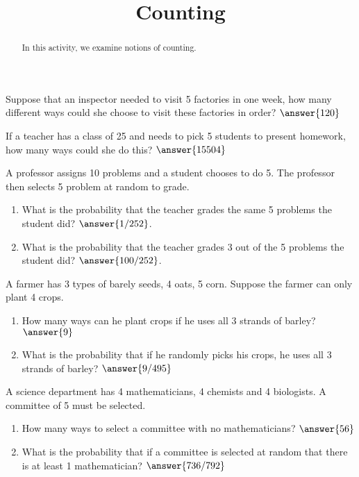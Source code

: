 \documentclass{ximera}
\title{Counting}
\begin{document}
      
\begin{abstract}
      
In this activity, we examine notions of counting.

      
\end{abstract}
      
\maketitle
 
\begin{problem}
Suppose that an inspector needed to visit 5 factories in one week, how many different ways could she choose to visit these factories in order? $\answer{120}$
\end{problem}

\begin{problem}
If a teacher has a class of 25 and needs to pick 5 students to present homework, how many ways could she do this? $\answer{15504}$
\end{problem}

\begin{problem}
A professor assigns 10 problems and a student chooses to do 5.  The professor then selects 5 problem at random to grade.

\begin{enumerate}
\item What is the probability that the teacher grades the same 5 problems the student did?  $\answer{1/252}$.
\item What is the probability that the teacher grades 3 out of the  5 problems the student did?  $\answer{100/252}$.
\end{enumerate}

\end{problem}

\begin{problem}
A farmer has 3 types of barely seeds, 4 oats, 5 corn.  Suppose the farmer can only plant 4 crops.

\begin{enumerate}
\item How many ways can he plant crops if he uses all 3 strands of barley? $\answer{9}$
\item What is the probability that if he randomly picks his crops, he uses all 3 strands of barley? $\answer{9/495}$
\end{enumerate}


\end{problem}

\begin{problem}
A  science department has 4 mathematicians, 4 chemists and 4 biologists.  A committee of 5 must be selected.

\begin{enumerate}
\item How many ways to select a committee with no mathematicians? $\answer{56}$
\item What is the probability that if a committee is selected at random that there is at least 1 mathematician? $\answer{736/792}$
\end{enumerate}


\end{problem}
\end{document}
